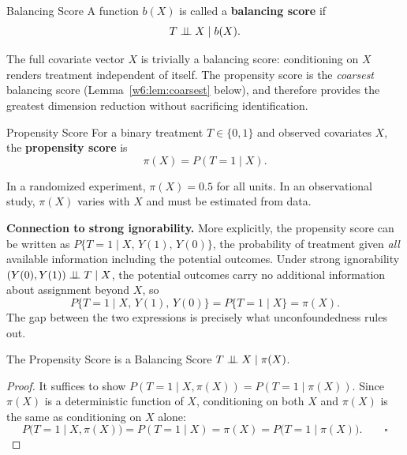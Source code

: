 \documentclass[master.tex]{subfiles}
\begin{document}
\begin{defn}{Balancing Score \citep{rosenbaum1983central}}
\label{w6:defn:balancing-score}
A function $b(X)$ is called a \textbf{balancing score} if
\[
  T \perp\!\!\!\perp X \mid b(X).
\]
\end{defn}

\noindent The full covariate vector $X$ is trivially a balancing score:
conditioning on $X$ renders treatment independent of itself.  The
propensity score is the \emph{coarsest} balancing score
(Lemma~\ref{w6:lem:coarsest} below), and therefore provides the
greatest dimension reduction without sacrificing identification.

\begin{defn}{Propensity Score \citep{rosenbaum1983central}}
\label{w6:defn:ps}
For a binary treatment $T \in \{0,1\}$ and observed covariates $X$,
the \textbf{propensity score} is
\[
  \pi(X) = P(T{=}1 \mid X).
\]
\end{defn}

\noindent In a randomized experiment, $\pi(X) = 0.5$ for all units.  In
an observational study, $\pi(X)$ varies with $X$ and must be estimated
from data.

\medskip\noindent\textbf{Connection to strong ignorability.}
More explicitly, the propensity score can be written as
$P\{T{=}1 \mid X,\, Y(1),\, Y(0)\}$, the probability of treatment
given \emph{all} available information including the potential outcomes.
Under strong ignorability $(Y(0),Y(1)) \perp\!\!\!\perp T \mid X$, the potential
outcomes carry no additional information about assignment beyond $X$,
so
\[
  P\bigl\{T{=}1 \mid X,\, Y(1),\, Y(0)\bigr\}
  = P\{T{=}1 \mid X\}
  = \pi(X).
\]
The gap between the two expressions is precisely what unconfoundedness
rules out.

\begin{thm}{The Propensity Score is a Balancing Score \citep{rosenbaum1983central}}
\label{w6:thm:balance}
$T \perp\!\!\!\perp X \mid \pi(X)$.
\end{thm}

\begin{proof}
It suffices to show $P(T{=}1 \mid X, \pi(X)) = P(T{=}1 \mid \pi(X))$.
Since $\pi(X)$ is a deterministic function of $X$, conditioning on both
$X$ and $\pi(X)$ is the same as conditioning on $X$ alone:
\[
  P\bigl(T{=}1 \mid X, \pi(X)\bigr) = P(T{=}1 \mid X) = \pi(X)
  = P\bigl(T{=}1 \mid \pi(X)\bigr). \qquad\square
\]
\end{proof}
\end{document}
